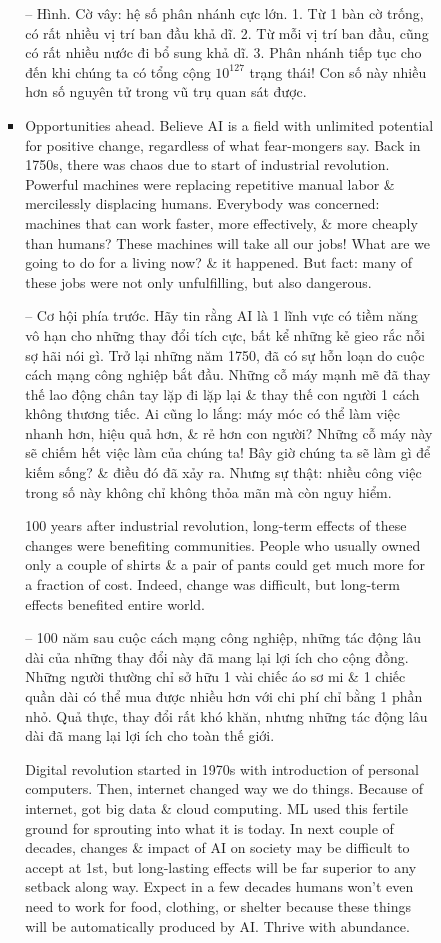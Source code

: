 \documentclass{article}
\begin{document}
\begin{itemize}
\begin{itemize}
\begin{itemize}
\begin{itemize}
                -- {\sf Hình. Cờ vây: hệ số phân nhánh cực lớn.} 1. Từ 1 bàn cờ trống, có rất nhiều vị trí ban đầu khả dĩ. 2. Từ mỗi vị trí ban đầu, cũng có rất nhiều nước đi bổ sung khả dĩ. 3. Phân nhánh tiếp tục cho đến khi chúng ta có tổng cộng $10^{127}$ trạng thái! Con số này nhiều hơn số nguyên tử trong vũ trụ quan sát được.
                \item {\sf Opportunities ahead.} Believe AI is a field with unlimited potential for positive change, regardless of what fear-mongers say. Back in 1750s, there was chaos due to start of industrial revolution. Powerful machines were replacing repetitive manual labor \& mercilessly displacing humans. Everybody was concerned: machines that can work faster, more effectively, \& more cheaply than humans? These machines will take all our jobs! What are we going to do for a living now? \& it happened. But fact: many of these jobs were not only unfulfilling, but also dangerous.

                -- {\sf Cơ hội phía trước.} Hãy tin rằng AI là 1 lĩnh vực có tiềm năng vô hạn cho những thay đổi tích cực, bất kể những kẻ gieo rắc nỗi sợ hãi nói gì. Trở lại những năm 1750, đã có sự hỗn loạn do cuộc cách mạng công nghiệp bắt đầu. Những cỗ máy mạnh mẽ đã thay thế lao động chân tay lặp đi lặp lại \& thay thế con người 1 cách không thương tiếc. Ai cũng lo lắng: máy móc có thể làm việc nhanh hơn, hiệu quả hơn, \& rẻ hơn con người? Những cỗ máy này sẽ chiếm hết việc làm của chúng ta! Bây giờ chúng ta sẽ làm gì để kiếm sống? \& điều đó đã xảy ra. Nhưng sự thật: nhiều công việc trong số này không chỉ không thỏa mãn mà còn nguy hiểm.

                100 years after industrial revolution, long-term effects of these changes were benefiting communities. People who usually owned only a couple of shirts \& a pair of pants could get much more for a fraction of cost. Indeed, change was difficult, but long-term effects benefited entire world.

                -- 100 năm sau cuộc cách mạng công nghiệp, những tác động lâu dài của những thay đổi này đã mang lại lợi ích cho cộng đồng. Những người thường chỉ sở hữu 1 vài chiếc áo sơ mi \& 1 chiếc quần dài có thể mua được nhiều hơn với chi phí chỉ bằng 1 phần nhỏ. Quả thực, thay đổi rất khó khăn, nhưng những tác động lâu dài đã mang lại lợi ích cho toàn thế giới.

                Digital revolution started in 1970s with introduction of personal computers. Then, internet changed way we do things. Because of internet, got big data \& cloud computing. ML used this fertile ground for sprouting into what it is today. In next couple of decades, changes \& impact of AI on society may be difficult to accept at 1st, but long-lasting effects will be far superior to any setback along way. Expect in a few decades humans won't even need to work for food, clothing, or shelter because these things will be automatically produced by AI. Thrive with abundance.


\end{itemize}
\end{itemize}
\end{itemize}
\end{itemize}
\end{document}
